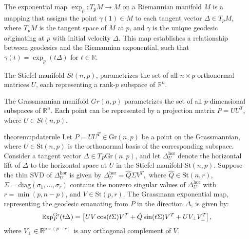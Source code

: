 \begin{definition}
\label{def:exp-map}
    The exponential map \( \exp_p : T_pM \to M \) on a Riemannian manifold \( M \) is a mapping that assigns the point \( \gamma(1) \in M \) to each tangent vector \( \Delta \in T_pM \), where \( T_pM \) is the tangent space of \( M \) at \( p \), and \( \gamma \) is the unique geodesic originating at \( p \) with initial velocity \( \Delta \). This map establishes a relationship between geodesics and the Riemannian exponential, such that \( \gamma(t) = \exp_p(t\Delta) \) for \( t \in \mathbb{R} \).
 \end{definition}
 \begin{definition}\label{def:st}
    The Stiefel manifold \(St(n, p)\), parametrizes the set of all \(n \times p\) orthonormal matrices \(U\), each representing a rank-\(p\) subspace of \(\mathbb{R}^n\).
 \end{definition}
  \begin{definition}\label{def:gr}
    The Grassmannian manifold \(Gr(n, p)\) parametrizes the set of all \(p\)-dimensional subspaces of \(\mathbb{R}^n\). Each point can be represented by a projection matrix \(P = UU^T\), where \(U \in St(n, p)\).
 \end{definition}
\begin{restatable}{theorem}{updaterule}
\label{theorem:gr_exp} 
    Let \( P = UU^T \in \text{Gr}(n,p) \) be a point on the Grassmannian, where \( U \in \text{St}(n,p) \) is the orthonormal basis of the corresponding subspace. Consider a tangent vector \( \Delta \in T_P\text{Gr}(n,p) \), and let \( \Delta_U^{\text{hor}} \) denote the horizontal lift of \( \Delta \) to the horizontal space at \( U \) in the Stiefel manifold \( \text{St}(n,p) \). Suppose the thin SVD of \( \Delta_U^{\text{hor}} \) is given by
\( \Delta_U^{\text{hor}} = \hat{Q} \Sigma V^T, \)
    where \( \hat{Q} \in \text{St}(n,r) \), \( \Sigma = \text{diag}(\sigma_1, \ldots, \sigma_r) \) contains the nonzero singular values of \( \Delta_U^{\text{hor}} \) with \( r = \min(p, n-p) \), and \( V \in \text{St}(p,r) \). The Grassmann exponential map, representing the geodesic emanating from \( P \) in the direction \( \Delta \), is given by:
    \begin{equation*}
    \small
    \text{Exp}_P^{\text{Gr}}(t\Delta) = \big[ UV\cos(t\Sigma)V^T + \hat{Q}\sin(t\Sigma)V^T + UV_\perp V_\perp^T \big],
    \end{equation*}
    where \( V_\perp \in \mathbb{R}^{p \times (p-r)} \) is any orthogonal complement of \( V \).
\end{restatable}
